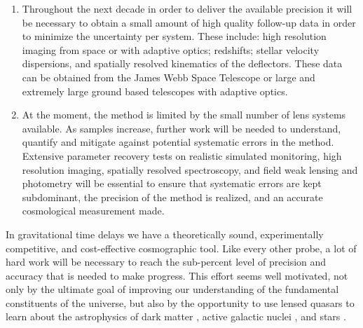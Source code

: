 \begin{enumerate}
%
\item Throughout the next decade in order to deliver the
available precision it will be necessary to obtain a small amount of
high quality follow-up data in order to minimize the uncertainty per
system. These include: high resolution imaging from space or with
adaptive optics; redshifts; stellar velocity dispersions, and
spatially resolved kinematics of the deflectors. These data can be
obtained from the James Webb Space Telescope or large and extremely
large ground based telescopes with adaptive optics.
%
%
\item  At the moment, the method is limited by the small number of lens
systems available. As samples increase, further work will be needed to
understand, quantify and mitigate against potential systematic errors
in the method. Extensive parameter recovery tests on realistic
simulated monitoring, high resolution imaging, spatially resolved
spectroscopy, and field weak lensing and photometry will be essential
to ensure that systematic errors are kept subdominant, the precision
of the method is realized, and an accurate cosmological measurement
made.
\end{enumerate}


In gravitational time delays we have a theoretically sound,
experimentally competitive, and cost-effective cosmographic tool.
Like every other probe, a lot of hard work will be necessary to reach
the sub-percent level of precision and accuracy that is needed to make
progress. This effort seems well motivated, not only by the ultimate
goal of improving our understanding of the fundamental constituents of
the universe, but also by the opportunity to use lensed quasars to
learn about the astrophysics of dark matter
\citep{M+M01,D+K02,Metcalf:2005p1203,Xu++09,Veg++14,Nie++14}, active galactic
nuclei \citep{PMK08,Eig++08a,Eig++08b,Blackburne:2010p6600,Mac++15},
and stars
\citep{Sch++14}.

